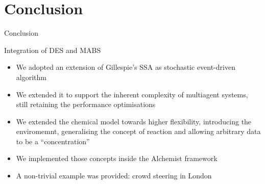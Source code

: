 \documentclass[presentation]{beamer} %
\begin{document}
\section{Conclusion}
\begin{frame}{Conclusion}
  \begin{block}{Integration of DES and MABS}
    \begin{itemize}
      \item We adopted an extension of Gillespie's SSA as stochastic event-driven algorithm
      \item We extended it to support the inherent complexity of multiagent systems, still retaining the performance optimisations
      \item We extended the chemical model towards higher flexibility, introducing the enviromemnt, generalising the concept of reaction and allowing arbitrary data to be a ``concentration''
      \item We implemented those concepts inside the Alchemist framework
      \item A non-trivial example was provided: crowd steering in London
    \end{itemize}
  \end{block}
\end{frame}



\section*{\refname}
\begin{frame}[allowframebreaks]
  \frametitle{\refname}
  \scriptsize
  
  
\end{frame}
\section*{\refname}
\end{document}
